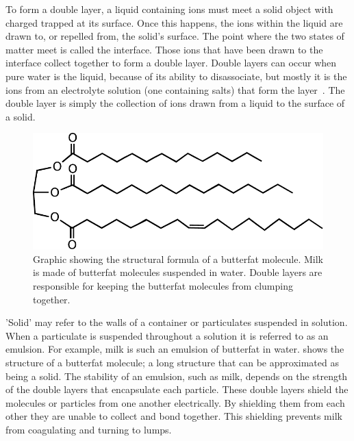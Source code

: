     To form a double layer, a liquid containing ions must meet a solid object with charged trapped at its surface.
    Once this happens, the ions within the liquid are drawn to, or repelled from, the solid's surface.
    The point where the two states of matter meet is called the interface.
    Those ions that have been drawn to the interface collect together to form a double layer.
    Double layers can occur when pure water is the liquid, because of its ability to disassociate, but mostly it is the ions from an electrolyte solution (one containing salts) that form the layer~\cite{Bruesch2004}.
    The double layer is simply the collection of ions drawn from a liquid to the surface of a solid.


    \begin{figure}
        \begin{center}
            \includegraphics[scale=0.8]{content/introduction/graphics/butterfat}
        \end{center}
        \caption{Graphic showing the structural formula of a butterfat molecule. Milk is made of butterfat molecules suspended in water. Double layers are responsible for keeping the butterfat molecules from clumping together.}
        \label{fig:butterfat}
    \end{figure}
    'Solid' may refer to the walls of a container or particulates suspended in solution.
    When a particulate is suspended throughout a solution it is referred to as an emulsion.
    For example, milk is such an emulsion of butterfat in water.
     shows the structure of a butterfat molecule; a long structure that can be approximated as being a solid.
    The stability of an emulsion, such as milk, depends on the strength of the double layers that encapsulate each particle.
    These double layers shield the molecules or particles from one another electrically.
    By shielding them from each other they are unable to collect and bond together.
    This shielding prevents milk from coagulating and turning to lumps.

